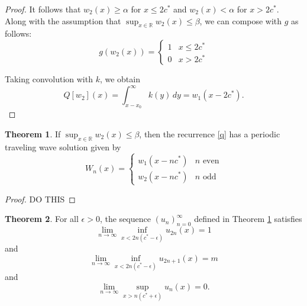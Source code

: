 \documentclass[11pt]{article}
\theoremstyle{definition}
\newtheorem{thm}{Theorem}
\numberwithin{equation}{section}
\numberwithin{thm}{section}
\renewcommand{\a}{\alpha}
\renewcommand{\b}{\beta}
\begin{document}
\begin{proof}
It follows that $w_2(x)\geq\a$ for $x\leq 2c^*$ and $w_2(x)<\alpha$ for $x>2c^*$. Along with the assumption that $\sup_{x\in\mathbb R}w_2(x)\leq\b$, we can compose with $g$ as follows:
\begin{equation} \label{gw2}
g(w_2(x)) = \begin{cases}
1 & x \leq 2c^* \\
0 & x > 2c^*
\end{cases} \end{equation}

Taking convolution with $k$, we obtain
\begin{equation}
Q[w_2](x) = \int_{x-x_0}^{\infty} k(y)\,dy = w_1(x-2c^*).
\end{equation}
\end{proof}

\begin{thm} \label{theorem1}
If $\sup_{x\in\mathbb R}w_2(x)\leq \b$, then the recurrence \eqref{q} has a periodic traveling wave solution given by
\begin{equation} \label{ptw}
W_n(x) = \begin{cases}
w_1(x-nc^*) & n \text{ even} \\
w_2(x-nc^*) & n \text{ odd}
\end{cases}
\end{equation}
\end{thm}

\begin{proof}
DO THIS
\end{proof}

\begin{thm}  \label{theorem2}
For all $\epsilon>0$, the sequence $(u_n)_{n=0}^{\infty}$ defined in Theorem \ref{theorem1} satisfies
\begin{equation}
\lim_{n\to\infty}\inf_{x<2n(c^*-\epsilon)}u_{2n}(x)=1
\end{equation}
and
\begin{equation}
\lim_{n\to\infty}\inf_{x<2n(c^*-\epsilon)}u_{2n+1}(x)=m
\end{equation}
and 
\begin{equation}
\lim_{n\to\infty}\sup_{x>n(c^*+\epsilon)}u_n(x)=0.
\end{equation}
\end{thm}
\end{document}
